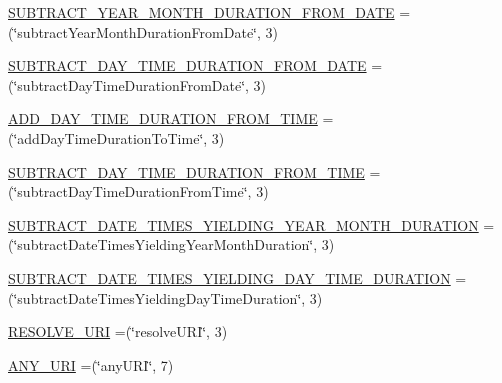 \begin{DoxyCompactItemize}
\item 
\hyperlink{enumorg_1_1semanticweb_1_1owlapi_1_1vocab_1_1_s_w_r_l_built_ins_vocabulary_a886fc3476bbec9511134dc8ecfd85329}{S\-U\-B\-T\-R\-A\-C\-T\-\_\-\-Y\-E\-A\-R\-\_\-\-M\-O\-N\-T\-H\-\_\-\-D\-U\-R\-A\-T\-I\-O\-N\-\_\-\-F\-R\-O\-M\-\_\-\-D\-A\-T\-E} =(\char`\"{}subtract\-Year\-Month\-Duration\-From\-Date\char`\"{}, 3)
\item 
\hyperlink{enumorg_1_1semanticweb_1_1owlapi_1_1vocab_1_1_s_w_r_l_built_ins_vocabulary_a03792c40010ac7a014b273b1977343b3}{S\-U\-B\-T\-R\-A\-C\-T\-\_\-\-D\-A\-Y\-\_\-\-T\-I\-M\-E\-\_\-\-D\-U\-R\-A\-T\-I\-O\-N\-\_\-\-F\-R\-O\-M\-\_\-\-D\-A\-T\-E} =(\char`\"{}subtract\-Day\-Time\-Duration\-From\-Date\char`\"{}, 3)
\item 
\hyperlink{enumorg_1_1semanticweb_1_1owlapi_1_1vocab_1_1_s_w_r_l_built_ins_vocabulary_adaa2800dad0a9e084a13011e4803f02a}{A\-D\-D\-\_\-\-D\-A\-Y\-\_\-\-T\-I\-M\-E\-\_\-\-D\-U\-R\-A\-T\-I\-O\-N\-\_\-\-F\-R\-O\-M\-\_\-\-T\-I\-M\-E} =(\char`\"{}add\-Day\-Time\-Duration\-To\-Time\char`\"{}, 3)
\item 
\hyperlink{enumorg_1_1semanticweb_1_1owlapi_1_1vocab_1_1_s_w_r_l_built_ins_vocabulary_a1cc1a6631ac8d9a8e61f69e8fe3f6af6}{S\-U\-B\-T\-R\-A\-C\-T\-\_\-\-D\-A\-Y\-\_\-\-T\-I\-M\-E\-\_\-\-D\-U\-R\-A\-T\-I\-O\-N\-\_\-\-F\-R\-O\-M\-\_\-\-T\-I\-M\-E} =(\char`\"{}subtract\-Day\-Time\-Duration\-From\-Time\char`\"{}, 3)
\item 
\hyperlink{enumorg_1_1semanticweb_1_1owlapi_1_1vocab_1_1_s_w_r_l_built_ins_vocabulary_a685cf2fbe91035859d38260aa3642ec9}{S\-U\-B\-T\-R\-A\-C\-T\-\_\-\-D\-A\-T\-E\-\_\-\-T\-I\-M\-E\-S\-\_\-\-Y\-I\-E\-L\-D\-I\-N\-G\-\_\-\-Y\-E\-A\-R\-\_\-\-M\-O\-N\-T\-H\-\_\-\-D\-U\-R\-A\-T\-I\-O\-N} =(\char`\"{}subtract\-Date\-Times\-Yielding\-Year\-Month\-Duration\char`\"{}, 3)
\item 
\hyperlink{enumorg_1_1semanticweb_1_1owlapi_1_1vocab_1_1_s_w_r_l_built_ins_vocabulary_af17d1539e994b0077597c642265faa90}{S\-U\-B\-T\-R\-A\-C\-T\-\_\-\-D\-A\-T\-E\-\_\-\-T\-I\-M\-E\-S\-\_\-\-Y\-I\-E\-L\-D\-I\-N\-G\-\_\-\-D\-A\-Y\-\_\-\-T\-I\-M\-E\-\_\-\-D\-U\-R\-A\-T\-I\-O\-N} =(\char`\"{}subtract\-Date\-Times\-Yielding\-Day\-Time\-Duration\char`\"{}, 3)
\item 
\hyperlink{enumorg_1_1semanticweb_1_1owlapi_1_1vocab_1_1_s_w_r_l_built_ins_vocabulary_a361cf05008620bf7dccb8a021746d9bc}{R\-E\-S\-O\-L\-V\-E\-\_\-\-U\-R\-I} =(\char`\"{}resolve\-U\-R\-I\char`\"{}, 3)
\item 
\hyperlink{enumorg_1_1semanticweb_1_1owlapi_1_1vocab_1_1_s_w_r_l_built_ins_vocabulary_a4d5b0e1eaa324273205451273f876600}{A\-N\-Y\-\_\-\-U\-R\-I} =(\char`\"{}any\-U\-R\-I\char`\"{}, 7)
\end{DoxyCompactItemize}

